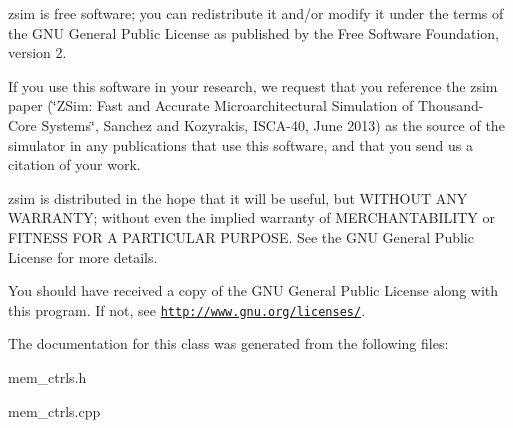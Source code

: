 zsim is free software; you can redistribute it and/or modify it under the terms of the G\-N\-U General Public License as published by the Free Software Foundation, version 2.

If you use this software in your research, we request that you reference the zsim paper (\char`\"{}\-Z\-Sim\-: Fast and Accurate Microarchitectural Simulation of
\-Thousand-\/\-Core Systems\char`\"{}, Sanchez and Kozyrakis, I\-S\-C\-A-\/40, June 2013) as the source of the simulator in any publications that use this software, and that you send us a citation of your work.

zsim is distributed in the hope that it will be useful, but W\-I\-T\-H\-O\-U\-T A\-N\-Y W\-A\-R\-R\-A\-N\-T\-Y; without even the implied warranty of M\-E\-R\-C\-H\-A\-N\-T\-A\-B\-I\-L\-I\-T\-Y or F\-I\-T\-N\-E\-S\-S F\-O\-R A P\-A\-R\-T\-I\-C\-U\-L\-A\-R P\-U\-R\-P\-O\-S\-E. See the G\-N\-U General Public License for more details.

You should have received a copy of the G\-N\-U General Public License along with this program. If not, see \href{http://www.gnu.org/licenses/}{\tt http\-://www.\-gnu.\-org/licenses/}. 

The documentation for this class was generated from the following files\-:\begin{DoxyCompactItemize}
\item 
mem\-\_\-ctrls.\-h\item 
mem\-\_\-ctrls.\-cpp\end{DoxyCompactItemize}
